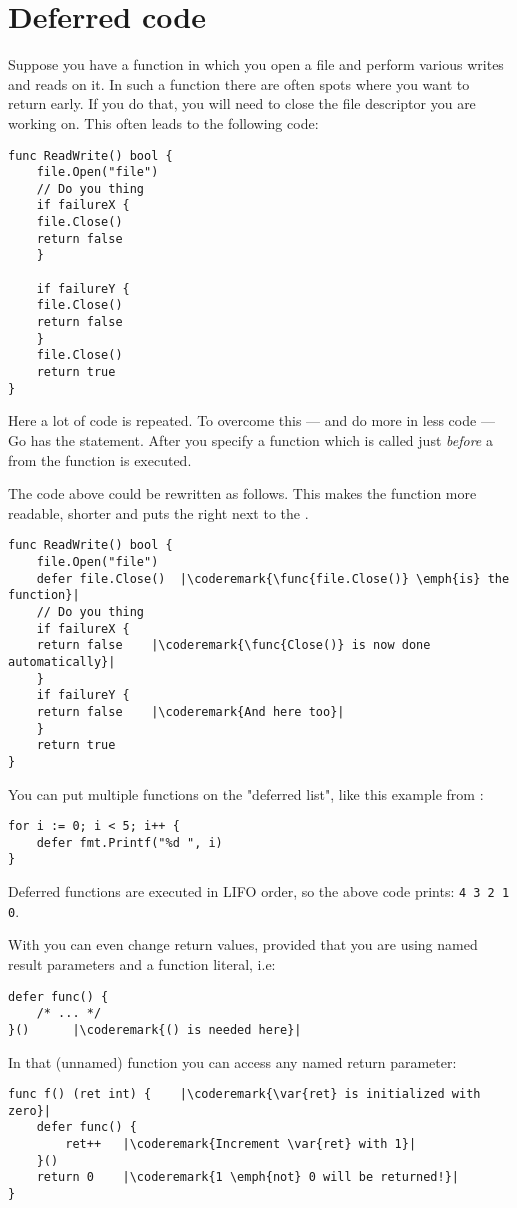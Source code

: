 \section{Deferred code}
Suppose you have a function in which you open a file and perform various
writes and reads on it. In such a function there are often spots where
you want to return early. If you do that, you will need to close the file
descriptor you are working on. This often leads to the following code:
\begin{lstlisting}[caption=Without \func{defer}]
func ReadWrite() bool {
    file.Open("file")
    // Do you thing
    if failureX {
	file.Close()
	return false
    }

    if failureY {
	file.Close()
	return false
    }
    file.Close()
    return true
}
\end{lstlisting}
Here a lot of code is repeated. To overcome this ---
and do more in less code --- Go has the
 statement. After
 you specify a function which is called just \emph{before} a
 from the function is executed.

The code above could be rewritten as follows. This makes the 
function more readable, shorter and puts the  right next 
to the .
\begin{lstlisting}[caption=With \func{defer}]
func ReadWrite() bool {
    file.Open("file")
    defer file.Close()	|\coderemark{\func{file.Close()} \emph{is} the function}|
    // Do you thing
    if failureX {
	return false    |\coderemark{\func{Close()} is now done automatically}|
    }
    if failureY {
	return false    |\coderemark{And here too}|
    }
    return true
}
\end{lstlisting}
You can put multiple functions on the "deferred list", like this
example from \cite{effective_go}:
\begin{lstlisting}
for i := 0; i < 5; i++ { 
    defer fmt.Printf("%d ", i) 
} 
\end{lstlisting}
Deferred functions are executed in LIFO order, so the above code
prints: \lstinline{4 3 2 1 0}. 


With  you can even change return values, provided that
you are using named result parameters and a function
literal, i.e:
\begin{lstlisting}[caption=Function literal]
defer func() {
	/* ... */
}()		 |\coderemark{() is needed here}|
\end{lstlisting}
In that (unnamed) function you can access any named return
parameter:
\begin{lstlisting}[caption=Access return values within \func{defer}]
func f() (ret int) {    |\coderemark{\var{ret} is initialized with zero}|
	defer func() {
		ret++	|\coderemark{Increment \var{ret} with 1}|
	}()
	return 0	|\coderemark{1 \emph{not} 0 will be returned!}|
}
\end{lstlisting}

